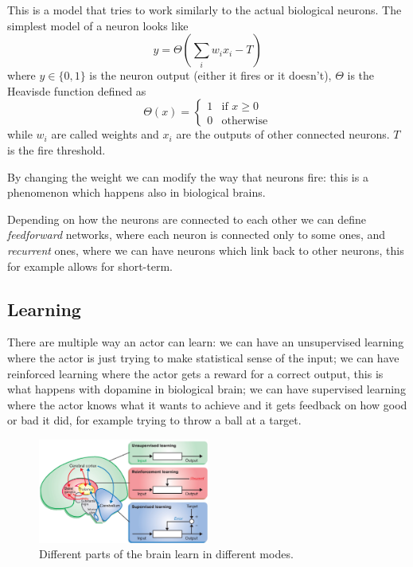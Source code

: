 \documentclass[12pt]{extarticle}
\begin{document}
This is a model that tries to work similarly to the actual biological neurons.
The simplest model of a neuron looks like
\begin{equation}
	y = \Theta \left(\sum_i w_i x_i - T \right)
\end{equation}
where $y \in \{0, 1\}$ is the neuron output (either it fires or it doesn't),
$\Theta$ is the Heavisde function defined as
\begin{equation}
	\Theta(x) = \begin{cases}
		1 & \text{if } x \geq 0 \\
		0 & \text{otherwise}
	\end{cases}
\end{equation}
while $w_i$ are called weights and $x_i$ are the outputs of other connected neurons.
$T$ is the fire threshold.

By changing the weight we can modify the way that neurons fire: this is a phenomenon which happens
also in biological brains.

Depending on how the neurons are connected to each other we can define \emph{feedforward}
networks, where each neuron is connected only to some  ones, and \emph{recurrent} ones,
where we can have neurons which link back to other neurons, this for example allows for short-term.

\subsection{Learning}

There are multiple way an actor can learn: we can have an unsupervised learning where the actor
is just trying to make statistical sense of the input;
we can have reinforced learning where the actor gets a reward for a correct output, this is what
happens with dopamine in biological brain;
we can have supervised learning where the actor knows what it wants to achieve and it gets feedback
on how good or bad it did, for example trying to throw a ball at a target.

\begin{figure}[H]
	\centering
	\includegraphics[width=0.5\textwidth]{./assets/modelling-ml/brain-learning-types.jpg}
	\caption{Different parts of the brain learn in different modes.}
\end{figure}
\end{document}
